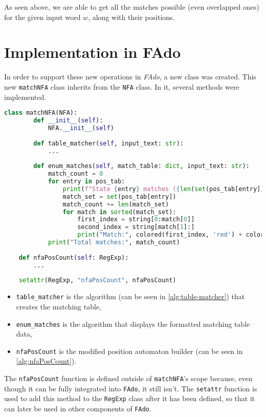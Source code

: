 As seen above, we are able to get all the matches possible (even overlapped ones) for the given input word $w$, along with their positions.

\section{Implementation in FAdo}
In order to support these new operations in \textit{FAdo}, a new class was created. This new \texttt{matchNFA} class inherits from the \texttt{NFA} class. In it, several methods were implemented.
\begin{lstlisting}[language=Python]
	class matchNFA(NFA):
		def __init__(self):
			NFA.__init__(self)
		
		def table_matcher(self, input_text: str):
			...
			
		def enum_matches(self, match_table: dict, input_text: str):
			match_count = 0
			for entry in pos_tab:
				print(f"State {entry} matches ({len(set(pos_tab[entry]))}):")
				match_set = set(pos_tab[entry])
				match_count += len(match_set)
				for match in sorted(match_set):
					first_index = string[0:match[0]]
					second_index = string[match[1]:]
					print("Match:", colored(first_index, 'red') + colored(string[match[0]:match[1]], 'green') + colored(second_index, 'red'), "=>", match)
			print("Total matches:", match_count)
	
	def nfaPosCount(self: RegExp):
		...
	
	setattr(RegExp, "nfaPosCount", nfaPosCount)
\end{lstlisting}

\begin{itemize}
	\item \texttt{table\_matcher} is the algorithm (can be seen in \ref{alg:table-matcher}) that creates the matching table, 
	\item \texttt{enum\_matches} is the algorithm that displays the formatted matching table data,
	\item \texttt{nfaPosCount} is the modified position automaton builder (can be seen in \ref{alg:nfaPosCount}).
\end{itemize}

The \texttt{nfaPosCount} function is defined outside of \texttt{matchNFA}'s scope because, even though it can be fully integrated into \texttt{FAdo}, it still isn't. The \texttt{setattr} function is used to add this method to the \texttt{RegExp} class after it has been defined, so that it can later be used in other components of \texttt{FAdo}.


